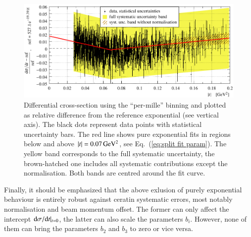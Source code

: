 \begin{figure}
\begin{center}
\includegraphics{fig/t_dist_rel_with_split_fit.pdf}
\vskip-4mm
\caption{%
Differential cross-section using the ``per-mille'' binning and plotted as relative difference from the reference exponential (see vertical axis). The black dots represent data points with statistical uncertainty bars. The red line shows pure exponential fits in regions below and above $|t| = 0.07\,{\rm GeV^2}$, see Eq.~(\ref{eq:split fit param}). The yellow band corresponds to the full systematic uncertainty, the brown-hatched one includes all systematic contributions except the normalisation. Both bands are centred around the fit curve.
}
\label{fig:data rel cpb0.001}
\end{center}
\end{figure}

Finally, it should be emphasized that the above exlusion of purely exponential behaviour is entirely robust against ceratin systematic errors, most notably normalisation and beam momentum offset. The former can only affect the intercept ${\rm d}\sigma/{\rm d} t|_{t=0}$, the latter can also scale the parameters $b_i$. However, none of them can bring the parameters $b_2$ and $b_3$ to zero or vice versa.
